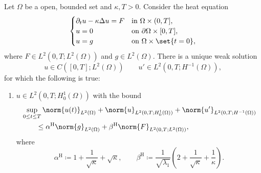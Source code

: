 \begin{theorem}\label{thm:heat-estimates}
Let \(\Omega\) be a open, bounded set and $\kappa, T > 0$.
Consider the heat equation
\begin{equation}\label{eq:heat-general}
\begin{cases}
\partial_t u-\kappa\Delta u=F & \text{in }\Omega\times(0,T],\\
u=0 & \text{on }\partial\Omega\times[0,T],\\
u=g & \text{on }\Omega\times\set{t=0},
\end{cases}
\end{equation}
where \(F\in L^2(0,T;L^2(\Omega))\) and \(g\in L^2(\Omega)\).  There is a
unique weak solution
\[
    u\in C([0,T];L^2(\Omega))
    \qquad
    u'\in L^2(0,T;H^{-1}(\Omega)),
\]
for which the following is true:
\begin{enumerate}[label=\textup{(\arabic*)}]
\item\label{thm:heat-estimates-l2} $u \in L^2(0,T;H_0^1(\Omega))$ with the bound
\begin{equation}\label{eq:explicit-L2-estimate}
\begin{split}
    &\sup_{0\le t\le T}\norm{u(t)}_{L^2(\Omega)}
    + \norm{u}_{L^2(0,T;H_0^1(\Omega))}
    + \norm{u'}_{L^2(0,T;H^{-1}(\Omega))}
    \\
    &\qquad\le
    \alpha^{\mathrm H}\norm{g}_{L^2(\Omega)}
    +
    \beta^{\mathrm H}
    \norm{F}_{L^2(0,T;L^2(\Omega))},
\end{split}
\end{equation}
where
\begin{equation}\label{eq:heat-alpha-beta-constants}
    \alpha^{\mathrm H}\coloneqq 1+\frac1{\sqrt{\kappa}}+\sqrt{\kappa},
    \qquad
    \beta^{\mathrm H}\coloneqq \frac1{\sqrt{\lambda_1}}
    \left(
        2+
        \frac1{\sqrt{\kappa}}
        +
        \frac1{\kappa}
    \right).
\end{equation}


\end{enumerate}
\end{theorem}
